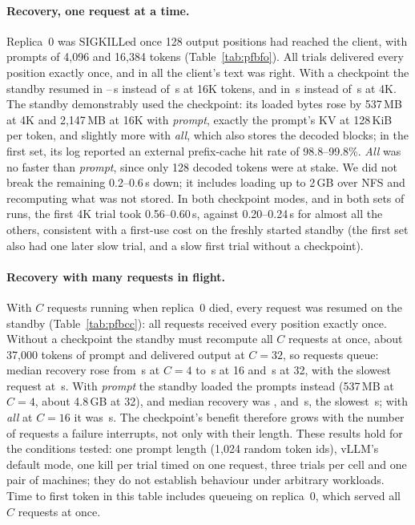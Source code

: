\documentclass[10pt,twocolumn]{article}
\begin{document}
\paragraph{Recovery, one request at a time.} Replica~0 was SIGKILLed once 128
output positions had reached the client, with prompts of 4{,}096 and
16{,}384 tokens (Table~\ref{tab:pfbfo}). All \PfbTrials{} trials delivered
every position exactly once, and in all \PfbTextOk{} the client's text was
right. With a checkpoint the standby resumed in
\PfbSixteenPrompt--\PfbSixteenAll\,s instead of \PfbSixteenNone\,s at 16K
tokens, and in \PfbFourPrompt\,s instead of \PfbFourNone\,s at 4K. The
standby demonstrably used the checkpoint: its loaded bytes rose by 537\,MB at
4K and 2{,}147\,MB at 16K with \emph{prompt}, exactly the prompt's KV at
128\,KiB per token, and slightly more with \emph{all}, which also stores the
decoded blocks; in the first set, its log reported an external prefix-cache
hit rate of 98.8--99.8\%. \emph{All} was no faster than \emph{prompt}, since
only 128 decoded tokens were at stake. We did not break the remaining
0.2--0.6\,s down; it includes loading up to 2\,GB over NFS and recomputing
what was not stored. In both checkpoint modes, and in both sets of runs,
the first 4K trial took 0.56--0.60\,s, against 0.20--0.24\,s for almost all
the others, consistent with a first-use cost on the freshly started standby
(the first set also had one later slow trial, and a slow first trial without
a checkpoint).

\paragraph{Recovery with many requests in flight.} With $C$ requests running
when replica~0 died, every request was resumed on the standby
(Table~\ref{tab:pfbcc}): all \PccRecords{} requests received every position
exactly once. Without a checkpoint the standby must recompute all $C$
requests at once, about 37{,}000 tokens of prompt and delivered output at
$C{=}32$, so requests queue: median recovery rose from \PccFourNone\,s at
$C{=}4$ to \PccSixteenNone\,s at 16 and \PccThirtyTwoNone\,s at 32, with the
slowest request at \PccThirtyTwoNoneMax\,s. With \emph{prompt} the standby
loaded the prompts instead (537\,MB at $C{=}4$, about 4.8\,GB at 32), and
median recovery was \PccFourPrompt, \PccSixteenPrompt{} and
\PccThirtyTwoPrompt\,s, the slowest \PccThirtyTwoPromptMax\,s; with
\emph{all} at $C{=}16$ it was \PccSixteenAll\,s. The checkpoint's benefit
therefore grows with the number of requests a failure interrupts, not only
with their length. These results hold for the conditions tested: one prompt
length (1{,}024 random token ids), vLLM's default mode, one kill per trial
timed on one request, three trials per cell and one pair of machines; they
do not establish behaviour under arbitrary workloads. Time to first token in this table includes queueing on
replica~0, which served all $C$ requests at once.
\end{document}
